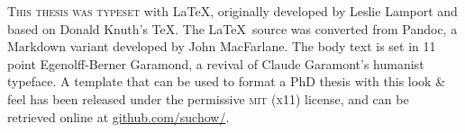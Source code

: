 
\newpage

\vspace*{50pt}

\begin{center}
\parbox{200pt}{\raggedright\lettrine[lines=3,slope=-2pt,nindent=-4pt]{\textcolor{SchoolColor}{T}}{his thesis was typeset} with \LaTeX, originally developed by Leslie Lamport and based on Donald Knuth's \TeX. The \LaTeX~source was converted from Pandoc, a Markdown variant developed by John MacFarlane. The body text is set in 11 point Egenolff-Berner Garamond, a revival of Claude Garamont's humanist typeface. A template that can be used to format a PhD thesis with this look \& feel has been released under the permissive \textsc{mit} (\textsc{x}11) license, and can be retrieved online at \href{https://github.com/suchow/}{github.com/suchow/}.
}
\end{center}